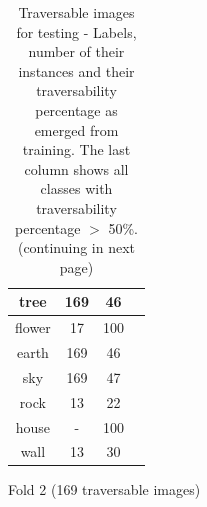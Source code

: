 \documentclass[12pt,a4paper,table,dvipsnames,tikz]{report}
\begin{document}
\begin{table}[h!]
\begin{subtable}[h!]{\textwidth}
\begin{tabular}{|c|c|c|c|}
				\hline
				\rowcolor{tree}
				tree & 169 & 46 &\\
				\hline
				flower & 17 & 100 & \checkmark\\
				\hline
				\rowcolor{earth}
				earth & 169 & 46 &\\
				\hline
				\rowcolor{sky}
				sky & 169 & 47 &\\
				\hline
				rock & 13 & 22 &\\
				\hline
				\rowcolor{house}
				house & - & 100 & \checkmark\\
				\hline
				wall & 13 & 30 &\\
				\hline
			\end{tabular}
			\caption{Fold 2 (169 traversable images)}
			\label{table:trav.f2}
		\end{subtable}
		\caption{Traversable images for testing - Labels, number of their instances and their 
			traversability percentage as emerged from training. The last column shows all 
			classes with traversability percentage $>$ 50\%. (continuing in next page)}
		\label{table:trav.folds}
	\end{table}
	
\end{document}
